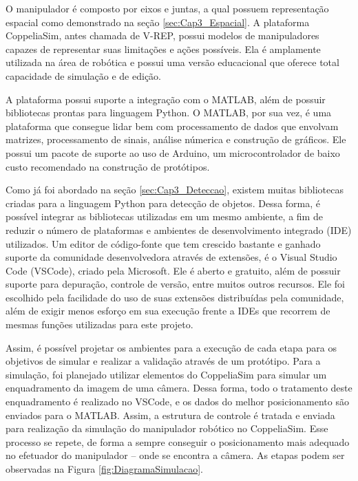 O manipulador é composto por eixos e juntas, a qual possuem representação espacial como demonstrado na seção \ref{sec:Cap3_Espacial}. A plataforma CoppeliaSim, antes chamada de V-REP, possui modelos de manipuladores capazes de representar suas limitações e ações possíveis. Ela é amplamente utilizada na área de robótica e possui uma versão educacional que oferece total capacidade de simulação e de edição.

A plataforma possui suporte a integração com o MATLAB, além de possuir bibliotecas prontas para linguagem Python. O MATLAB, por sua vez, é uma plataforma que consegue lidar bem com processamento de dados que envolvam matrizes, processamento de sinais, análise númerica e construção de gráficos. Ele possui um pacote de suporte ao uso de Arduino, um microcontrolador de baixo custo recomendado na construção de protótipos.

Como já foi abordado na seção \ref{sec:Cap3_Deteccao}, existem muitas bibliotecas criadas para a linguagem Python para detecção de objetos. Dessa forma, é possível integrar as bibliotecas utilizadas em um mesmo ambiente, a fim de reduzir o número de plataformas e ambientes de desenvolvimento integrado (IDE) utilizados. Um editor de código-fonte que tem crescido bastante e ganhado suporte da comunidade desenvolvedora através de extensões, é o  Visual Studio Code (VSCode), criado pela Microsoft. Ele é aberto e gratuito, além de possuir suporte para depuração, controle de versão, entre muitos outros recursos. Ele foi escolhido pela facilidade do uso de suas extensões distribuídas pela comunidade, além de exigir menos esforço em sua execução frente a IDEs que recorrem de mesmas funções utilizadas para este projeto.

Assim, é possível projetar os ambientes para a execução de cada etapa para os objetivos de simular e realizar a validação através de um protótipo. Para a simulação, foi planejado utilizar elementos do CoppeliaSim para simular um enquadramento da imagem de uma câmera. Dessa forma, todo o tratamento deste enquadramento é realizado no VSCode, e os dados do melhor posicionamento são enviados para o MATLAB. Assim, a estrutura de controle é tratada e enviada para realização da simulação do manipulador robótico no CoppeliaSim. Esse processo se repete, de forma a sempre conseguir o posicionamento mais adequado no efetuador do manipulador – onde se encontra a câmera. As etapas podem ser observadas na Figura \ref{fig:DiagramaSimulacao}.


